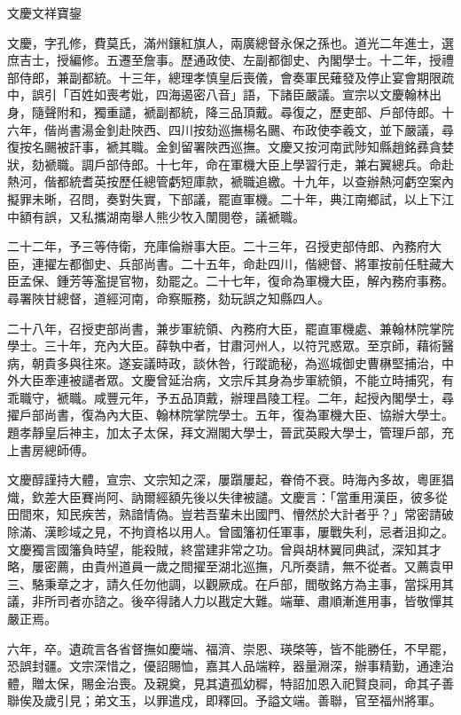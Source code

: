 
\begin{pinyinscope}
文慶文祥寶鋆

文慶，字孔修，費莫氏，滿州鑲紅旗人，兩廣總督永保之孫也。道光二年進士，選庶吉士，授編修。五遷至詹事。歷通政使、左副都御史、內閣學士。十二年，授禮部侍郎，兼副都統。十三年，總理孝慎皇后喪儀，會奏軍民薙發及停止宴會期限疏中，誤引「百姓如喪考妣，四海遏密八音」語，下諸臣嚴議。宣宗以文慶翰林出身，隨聲附和，獨重譴，褫副都統，降三品頂戴。尋復之，歷吏部、戶部侍郎。十六年，偕尚書湯金釗赴陜西、四川按劾巡撫楊名颺、布政使李羲文，並下嚴議，尋復按名颺被訐事，褫其職。金釗留署陜西巡撫。文慶又按河南武陟知縣趙銘彞貪婪狀，劾褫職。調戶部侍郎。十七年，命在軍機大臣上學習行走，兼右翼總兵。命赴熱河，偕都統耆英按歷任總管虧短庫款，褫職追繳。十九年，以查辦熱河虧空案內擬罪未晰，召問，奏對失實，下部議，罷直軍機。二十年，典江南鄉試，以上下江中額有誤，又私攜湖南舉人熊少牧入闈閱卷，議褫職。

二十二年，予三等侍衛，充庫倫辦事大臣。二十三年，召授吏部侍郎、內務府大臣，連擢左都御史、兵部尚書。二十五年，命赴四川，偕總督、將軍按前任駐藏大臣孟保、鍾芳等濫提官物，劾罷之。二十七年，復命為軍機大臣，解內務府事務。尋署陜甘總督，道經河南，命察賑務，劾玩誤之知縣四人。

二十八年，召授吏部尚書，兼步軍統領、內務府大臣，罷直軍機處、兼翰林院掌院學士。三十年，充內大臣。薛執中者，甘肅河州人，以符咒惑眾。至京師，藉術醫病，朝貴多與往來。遂妄議時政，談休咎，行蹤詭秘，為巡城御史曹楙堅捕治，中外大臣牽連被譴者眾。文慶曾延治病，文宗斥其身為步軍統領，不能立時捕究，有乖職守，褫職。咸豐元年，予五品頂戴，辦理昌陵工程。二年，起授內閣學士，尋擢戶部尚書，復為內大臣、翰林院掌院學士。五年，復為軍機大臣、協辦大學士。題孝靜皇后神主，加太子太保，拜文淵閣大學士，晉武英殿大學士，管理戶部，充上書房總師傅。

文慶醇謹持大體，宣宗、文宗知之深，屢躓屢起，眷倚不衰。時海內多故，粵匪猖熾，欽差大臣賽尚阿、訥爾經額先後以失律被譴。文慶言：「當重用漢臣，彼多從田間來，知民疾苦，熟諳情偽。豈若吾輩未出國門、懵然於大計者乎？」常密請破除滿、漢畛域之見，不拘資格以用人。曾國籓初任軍事，屢戰失利，忌者沮抑之。文慶獨言國籓負時望，能殺賊，終當建非常之功。曾與胡林翼同典試，深知其才略，屢密薦，由貴州道員一歲之間擢至湖北巡撫，凡所奏請，無不從者。又薦袁甲三、駱秉章之才，請久任勿他調，以觀厥成。在戶部，閻敬銘方為主事，當採用其議，非所司者亦諮之。後卒得諸人力以戡定大難。端華、肅順漸進用事，皆敬憚其嚴正焉。

六年，卒。遺疏言各省督撫如慶端、福濟、崇恩、瑛棨等，皆不能勝任，不早罷，恐誤封疆。文宗深惜之，優詔賜恤，嘉其人品端粹，器量淵深，辦事精勤，通達治體，贈太保，賜金治喪。及親奠，見其遺孤幼穉，特詔加恩入祀賢良祠，命其子善聯俟及歲引見；弟文玉，以罪遣戍，即釋回。予謚文端。善聯，官至福州將軍。


\end{pinyinscope}
